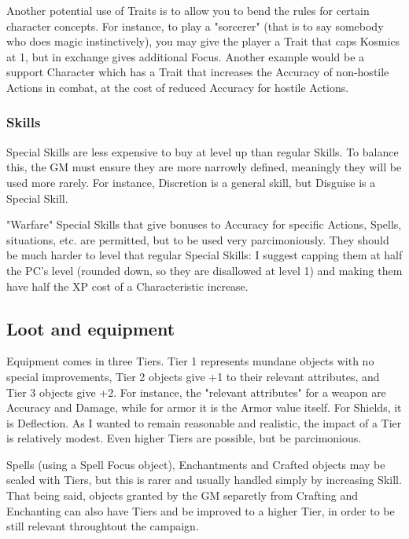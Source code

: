 Another potential use of Traits is to allow you to bend the rules for certain character concepts. For instance, to play a "sorcerer" (that is to say somebody who does magic instinctively), you may give the player a Trait that caps Kosmics at 1, but in exchange gives additional Focus. Another example would be a support Character which has a Trait that increases the Accuracy of non-hostile Actions in combat, at the cost of reduced Accuracy for hostile Actions.


\subsubsection{Skills}
\label{balancing_skills}

Special Skills are less expensive to buy at level up than regular Skills. To balance this, the GM must ensure they are more narrowly defined, meaningly they will be used more rarely. For instance, Discretion is a general skill, but Disguise is a Special Skill.

"Warfare" Special Skills that give bonuses to Accuracy for specific Actions, Spells, situations, etc. are permitted, but to be used very parcimoniously. They should be much harder to level that regular Special Skills: I suggest capping them at half the PC's level (rounded down, so they are disallowed at level 1) and making them have half the XP cost of a Characteristic increase.

\subsection{Loot and equipment}

\label{balancing_equipment}

Equipment comes in three Tiers. Tier 1 represents mundane objects with no special improvements, Tier 2 objects give +1 to their relevant attributes, and Tier 3 objects give +2. For instance, the "relevant attributes" for a weapon are Accuracy and Damage, while for armor it is the Armor value itself. For Shields, it is Deflection. As I wanted to remain reasonable and realistic, the impact of a Tier is relatively modest. Even higher Tiers are possible, but be parcimonious.

Spells (using a Spell Focus object), Enchantments and Crafted objects may be scaled with Tiers, but this is rarer and usually handled simply by increasing Skill. That being said, objects granted by the GM separetly from Crafting and Enchanting can also have Tiers and be improved to a higher Tier, in order to be still relevant throughtout the campaign.

